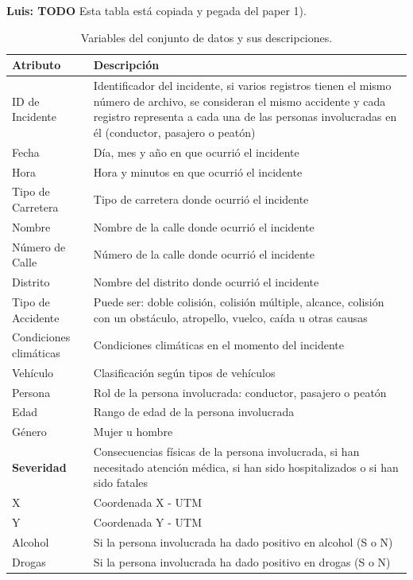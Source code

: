 \documentclass{uathesis-es}
\begin{document}
\textbf{Luis: TODO} Esta tabla está copiada y pegada del paper 1).\\
\begin{table}[H]
	\begin{center}
		\begin{tabular}{|p{3cm}|p{12cm}|}
			\hline
			\textbf{Atributo} & \textbf{Descripción} \\ \hline \hline
			ID de Incidente  & Identificador del incidente, si varios registros tienen el mismo número de archivo, se consideran el mismo accidente y cada registro representa a cada una de las personas involucradas en él (conductor, pasajero o peatón)  \\ \hline
			Fecha  & Día, mes y año en que ocurrió el incidente \\ \hline
			Hora  & Hora y minutos en que ocurrió el incidente \\ \hline
			Tipo de Carretera & Tipo de carretera donde ocurrió el incidente \\ \hline
			Nombre & Nombre de la calle donde ocurrió el incidente \\ \hline
			Número de Calle & Número de la calle donde ocurrió el incidente  \\ \hline
			Distrito & Nombre del distrito donde ocurrió el incidente \\ \hline
			Tipo de Accidente  & Puede ser: doble colisión, colisión múltiple, alcance, colisión con un obstáculo, atropello, vuelco, caída u otras causas \\ \hline
			Condiciones climáticas  & Condiciones climáticas en el momento del incidente \\ \hline
			Vehículo  & Clasificación según tipos de vehículos \\ \hline
			Persona  & Rol de la persona involucrada: conductor, pasajero o peatón \\ \hline
			Edad  & Rango de edad de la persona involucrada \\ \hline
			Género  & Mujer u hombre \\ \hline
			\textbf{Severidad}  & Consecuencias físicas de la persona involucrada, si han necesitado atención médica, si han sido hospitalizados o si han sido fatales \\ \hline
			X   & Coordenada X - UTM \\ \hline
			Y   & Coordenada Y - UTM \\ \hline
			Alcohol & Si la persona involucrada ha dado positivo en alcohol (S o N) \\ \hline
			Drogas & Si la persona involucrada ha dado positivo en drogas (S o N) \\ \hline \hline
		\end{tabular}
	\end{center}
	\caption{Variables del conjunto de datos y sus descripciones.}
	\label{Datadescription}
\end{table}
\end{document}
